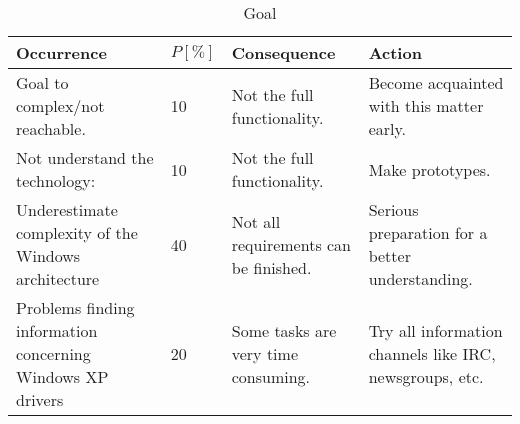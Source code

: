 \begin{longtable}{|X|p{1.2cm}|X|X|}
	\caption[]{\label{tab:riskListGoal} Goal}\\
    \hline
    \textbf{Occurrence} &
    \textbf{$P [\%]$} &
    \textbf{Consequence} &
    \textbf{Action} \\
    \hline
    \hline
	Goal to complex/not reachable. &
	10 &
	Not the full functionality. &
    Become acquainted with this matter early.\\
	\hline
	Not understand the technology: &
	10 &
	Not the full functionality. &
	Make prototypes. \\
	\hline
	Underestimate complexity of the Windows architecture &
	40 &
	Not all requirements can be finished. &
	Serious preparation for a better understanding.\\
	\hline
	Problems finding information concerning Windows XP drivers &
	20&
	Some tasks are very time consuming. &
	Try all information channels like IRC, newsgroups, etc.\\
	\hline
\end{longtable}
